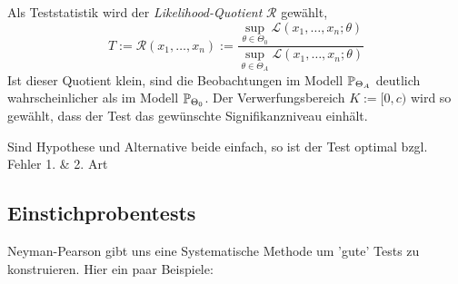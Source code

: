 
\begin{definition}
	Als Teststatistik wird der \emph{Likelihood-Quotient} \(\mathcal{R}\) gewählt,
	\[
		T :=
		\mathcal{R}(x_1,\ldots,x_n) :=
		\frac
		{\displaystyle\sup_{\theta\in\Theta_0}\mathcal{L}(x_1,\ldots,x_n ; \theta)}
		{\displaystyle\sup_{\theta\in\Theta_A}\mathcal{L}(x_1,\ldots,x_n ; \theta)}
	\]
	Ist dieser Quotient klein, sind die Beobachtungen im Modell \(\P_{\Theta_A}\) deutlich wahrscheinlicher
	als im Modell \(\P_{\Theta_0}\). Der Verwerfungsbereich \(K := [0,c)\) wird so gewählt,
	dass der Test das gewünschte Signifikanzniveau einhält.
\end{definition}

\begin{theorem}
	Sind Hypothese und Alternative beide einfach, so ist der Test optimal bzgl. Fehler 1. \& 2. Art
\end{theorem}



\subsection{Einstichprobentests}
Neyman-Pearson gibt uns eine Systematische Methode um 'gute' Tests zu konstruieren.
Hier ein paar Beispiele:


